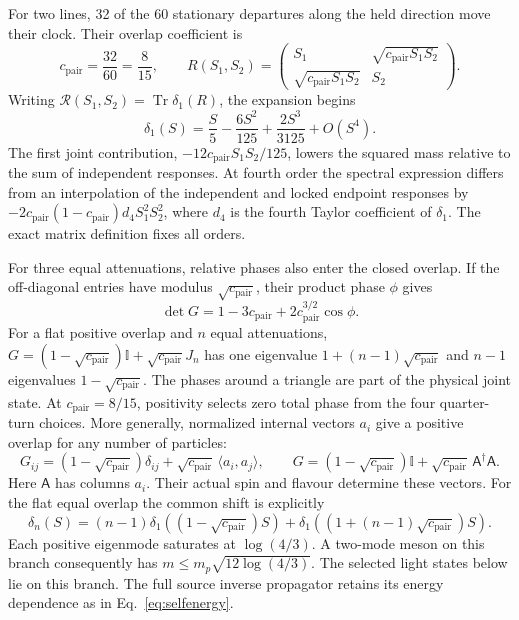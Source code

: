 \documentclass[aps,prx,onecolumn,10pt,notitlepage,nofootinbib,longbibliography]{revtex4-2}
\numberwithin{equation}{section}
\numberwithin{table}{section}
\newcommand{\Id}{\mathbb I}
\newcommand{\Tr}{\operatorname{Tr}}
\begin{document}
For two lines, 32 of the 60 stationary departures along the held direction move their clock. Their overlap coefficient is
\begin{equation}
 c_{\mathrm{pair}}=\frac{32}{60}=\frac8{15},\qquad
 R(S_1,S_2)=
 \begin{pmatrix}S_1&\sqrt{c_{\mathrm{pair}}S_1S_2}\\\sqrt{c_{\mathrm{pair}}S_1S_2}&S_2\end{pmatrix}.
 \label{eq:twoattenuations}
\end{equation}
Writing $\mathcal R(S_1,S_2)=\Tr\delta_1(R)$, the expansion begins
\begin{equation}
 \delta_1(S)=\frac S5-\frac{6S^2}{125}+\frac{2S^3}{3125}+O(S^4).
\end{equation}
The first joint contribution, $-12c_{\mathrm{pair}}S_1S_2/125$, lowers the squared mass relative to the sum of independent responses. At fourth order the spectral expression differs from an interpolation of the independent and locked endpoint responses by $-2c_{\mathrm{pair}}(1-c_{\mathrm{pair}})d_4S_1^2S_2^2$, where $d_4$ is the fourth Taylor coefficient of $\delta_1$. The exact matrix definition fixes all orders.

For three equal attenuations, relative phases also enter the closed overlap. If the off-diagonal entries have modulus $\sqrt{c_{\mathrm{pair}}}$, their product phase $\phi$ gives \begin{equation}
 \det G=1-3c_{\mathrm{pair}}+2c_{\mathrm{pair}}^{3/2}\cos\phi.
 \label{eq:threegram}
\end{equation} For a flat positive overlap and $n$ equal attenuations, $G=(1-\sqrt{c_{\mathrm{pair}}})\Id+\sqrt{c_{\mathrm{pair}}}J_n$ has one eigenvalue $1+(n-1)\sqrt{c_{\mathrm{pair}}}$ and $n-1$ eigenvalues $1-\sqrt{c_{\mathrm{pair}}}$. The phases around a triangle are part of the physical joint state. At $c_{\mathrm{pair}}=8/15$, positivity selects zero total phase from the four quarter-turn choices. More generally, normalized internal vectors $a_i$ give a positive overlap for any number of particles:
\begin{equation}
 G_{ij}=(1-\sqrt{c_{\mathrm{pair}}})\delta_{ij}+\sqrt{c_{\mathrm{pair}}}\,\langle a_i,a_j\rangle,
 \qquad G=(1-\sqrt{c_{\mathrm{pair}}})\Id+\sqrt{c_{\mathrm{pair}}}\,\mathsf A^\dagger\mathsf A.
 \label{eq:positiveoverlap}
\end{equation}
Here $\mathsf A$ has columns $a_i$. Their actual spin and flavour determine these vectors. For the flat equal overlap the common shift is explicitly
\begin{equation}
 \delta_n(S)=(n-1)\delta_1((1-\sqrt{c_{\mathrm{pair}}})S)
 +\delta_1((1+(n-1)\sqrt{c_{\mathrm{pair}}})S).
 \label{eq:equaloverlap}
\end{equation}
Each positive eigenmode saturates at $\log(4/3)$. A two-mode meson on this branch consequently has $m\leq m_p\sqrt{12\log(4/3)}$. The selected light states below lie on this branch. The full source inverse propagator retains its energy dependence as in Eq.~\eqref{eq:selfenergy}.
\end{document}
